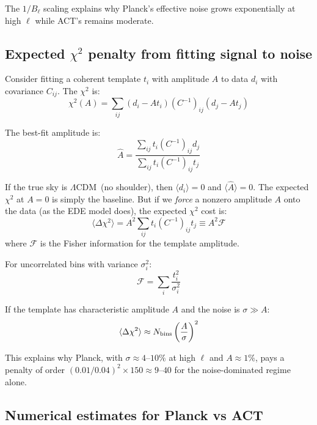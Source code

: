 \documentclass[twocolumn,showpacs,preprintnumbers,amsmath,amssymb,prd]{revtex4-2}
\newcommand{\lcdm}{$\Lambda$CDM}
\begin{document}
The $1/B_\ell$ scaling explains why Planck's effective noise grows exponentially 
at high $\ell$ while ACT's remains moderate.

\subsection{Expected $\chi^2$ penalty from fitting signal to noise}

Consider fitting a coherent template $t_i$ with amplitude $A$ to data $d_i$ 
with covariance $C_{ij}$. The $\chi^2$ is:
\begin{equation}
\chi^2(A) = \sum_{ij} (d_i - A t_i)(C^{-1})_{ij}(d_j - A t_j)
\end{equation}

The best-fit amplitude is:
\begin{equation}
\hat A = \frac{\sum_{ij} t_i (C^{-1})_{ij} d_j}{\sum_{ij} t_i (C^{-1})_{ij} t_j}
\end{equation}

If the true sky is \lcdm\ (no shoulder), then $\langle d_i \rangle = 0$ and 
$\langle \hat A \rangle = 0$. The expected $\chi^2$ at $A = 0$ is simply the 
baseline. But if we \emph{force} a nonzero amplitude $A$ onto the data 
(as the EDE model does), the expected $\chi^2$ cost is:
\begin{equation}
\langle \Delta\chi^2 \rangle = A^2 \sum_{ij} t_i (C^{-1})_{ij} t_j \equiv A^2 \mathcal{F}
\end{equation}
where $\mathcal{F}$ is the Fisher information for the template amplitude.

For uncorrelated bins with variance $\sigma_i^2$:
\begin{equation}
\mathcal{F} = \sum_i \frac{t_i^2}{\sigma_i^2}
\end{equation}

If the template has characteristic amplitude $A$ and the noise is $\sigma \gg A$:
\begin{equation}
\langle \Delta\chi^2 \rangle \approx N_{\rm bins} \left(\frac{A}{\sigma}\right)^2
\end{equation}

This explains why Planck, with $\sigma \approx 4$--$10\%$ at high $\ell$ and 
$A \approx 1\%$, pays a penalty of order $(0.01/0.04)^2 \times 150 \approx 9$--$40$ 
for the noise-dominated regime alone.

\subsection{Numerical estimates for Planck vs ACT}
\end{document}
